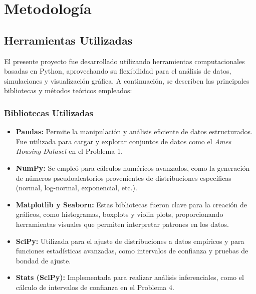 \documentclass[12pt]{article}
\begin{document}
\section{Metodología}
\subsection{Herramientas Utilizadas}

El presente proyecto fue desarrollado utilizando herramientas computacionales basadas en Python, aprovechando su flexibilidad para el análisis de datos, simulaciones y visualización gráfica. A continuación, se describen las principales bibliotecas y métodos teóricos empleados:

\subsubsection*{Bibliotecas Utilizadas}
\begin{itemize}
    \item \textbf{Pandas:} Permite la manipulación y análisis eficiente de datos estructurados. Fue utilizada para cargar y explorar conjuntos de datos como el \textit{Ames Housing Dataset} en el Problema 1.
    \item \textbf{NumPy:} Se empleó para cálculos numéricos avanzados, como la generación de números pseudoaleatorios provenientes de distribuciones específicas (normal, log-normal, exponencial, etc.).
    \item \textbf{Matplotlib y Seaborn:} Estas bibliotecas fueron clave para la creación de gráficos, como histogramas, boxplots y violin plots, proporcionando herramientas visuales que permiten interpretar patrones en los datos.
    \item \textbf{SciPy:} Utilizada para el ajuste de distribuciones a datos empíricos y para funciones estadísticas avanzadas, como intervalos de confianza y pruebas de bondad de ajuste.
    \item \textbf{Stats (SciPy):} Implementada para realizar análisis inferenciales, como el cálculo de intervalos de confianza en el Problema 4.
\end{itemize}
\end{document}
